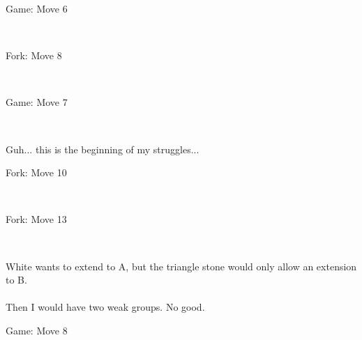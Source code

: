\documentclass{article}
\begin{document}
\newpage
\begin{section}{Game: Move 6}
\begin{center}
\cleargoban
{}
\showfullgoban
\\\parbox{4.5in}{
}
\end{center}
\end{section}
\begin{subsection}{Fork: Move 8}
\begin{center}
\cleargoban
{}
\showfullgoban
\\\parbox{4.5in}{
}
\end{center}
\end{subsection}
\newpage
\begin{section}{Game: Move 7}
\begin{center}
\cleargoban
{}
\showfullgoban
\\\parbox{4.5in}{
Guh... this is the beginning of my struggles...}
\end{center}
\end{section}
\begin{subsection}{Fork: Move 10}
\begin{center}
\cleargoban
{}
\showfullgoban
\\\parbox{4.5in}{
}
\end{center}
\end{subsection}
\begin{subsection}{Fork: Move 13}
\begin{center}
\cleargoban
{}
\showfullgoban
\\\parbox{4.5in}{
White wants to extend to A, but the triangle stone would only allow an extension to B.\\\\Then I would have two weak groups.  No good.}
\end{center}
\end{subsection}
\newpage
\begin{section}{Game: Move 8}
\begin{center}
\cleargoban
{}
\showfullgoban
\\\parbox{4.5in}{
}
\end{center}
\end{section}
\end{document}

